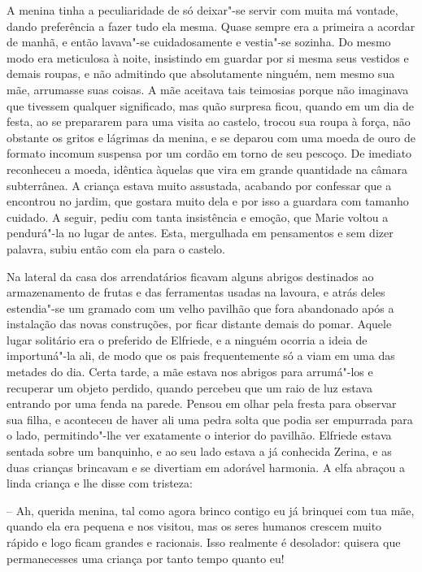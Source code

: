 A menina tinha a peculiaridade de só deixar"-se servir com muita má
vontade, dando preferência a fazer tudo ela mesma. Quase sempre era a
primeira a acordar de manhã, e então lavava"-se cuidadosamente e
vestia"-se sozinha. Do mesmo modo era meticulosa à noite, insistindo em
guardar por si mesma seus \mbox{vestidos} e demais roupas, e não admitindo que
absolutamente ninguém, nem mesmo sua mãe, arrumasse suas coisas. A mãe
aceitava tais teimosias porque não imaginava que tivessem qualquer
significado, mas quão surpresa ficou, quando em um dia de festa, ao se
prepararem para uma visita ao castelo, trocou sua roupa à força, não
obstante os gritos e lágrimas da menina, e se deparou com uma moeda de
ouro de formato incomum suspensa por um cordão em torno de seu pescoço.
De imediato reconheceu a moeda, idêntica àquelas que vira em
grande quantidade na câmara subterrânea. A criança estava muito
assustada, acabando por confessar que a encontrou no jardim, que
gostara muito dela e por isso a guardara com tamanho cuidado. A seguir,
pediu com tanta insistência e emoção, que Marie voltou a pendurá"-la no
lugar de antes. Esta, mergulhada em pensamentos e sem dizer palavra,
subiu então com ela para o castelo.

Na lateral da casa dos arrendatários ficavam alguns abrigos destinados
ao armazenamento de frutas e das ferramentas usadas na lavoura, e atrás
deles estendia"-se um gramado com um velho pavilhão que fora abandonado
após a instalação das novas construções, por ficar distante demais do
pomar. Aquele lugar solitário era o preferido de Elfriede, e a ninguém
ocorria a ideia de importuná"-la ali, de modo que os pais frequentemente
só a viam em uma das metades do dia. Certa tarde, a mãe estava nos
abrigos para arrumá"-los e recuperar um objeto perdido, quando percebeu
que um raio de luz estava entrando por uma fenda na parede. Pensou em
olhar pela fresta para observar sua filha, e aconteceu de haver ali uma
pedra solta que podia ser empurrada para o lado, permitindo"-lhe ver
exatamente o interior do pavilhão. Elfriede estava sentada sobre um
banquinho, e ao seu lado estava a já conhecida Zerina, e as duas
crianças brincavam e se divertiam em adorável harmonia. A elfa abraçou
a linda criança e lhe disse com tristeza:

-- Ah, querida menina, tal como agora brinco contigo eu já brinquei
com tua mãe, quando ela era pequena e nos visitou, mas os seres humanos
crescem muito rápido e logo ficam grandes e racionais. Isso realmente é
desolador: quisera que permanecesses uma criança por tanto tempo quanto eu!

